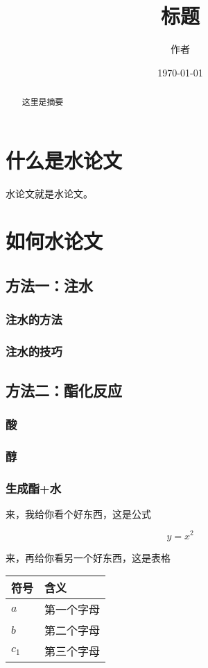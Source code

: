 \documentclass[UTF8]{ctexart}
\begin{document}
\title{标题}
\author{作者}
\date{\today}
\maketitle

\begin{abstract}
这里是摘要
\end{abstract}

\tableofcontents


\section{什么是水论文}

水论文就是水论文。

\section{如何水论文}

\subsection{方法一：注水}

\subsubsection{注水的方法}

\subsubsection{注水的技巧}

\subsection{方法二：酯化反应}

\subsubsection{酸}

\subsubsection{醇}

\subsubsection{生成酯+水}

来，我给你看个好东西，这是公式

\begin{equation}
y=x^2
\end{equation}

来，再给你看另一个好东西，这是表格


\begin{tabular}{ll}
\toprule
 符号 & 含义       \\
\midrule
 $a$    & 第一个字母 \\
 $b$    & 第二个字母 \\
 $c_1$    & 第三个字母 \\
\bottomrule
\end{tabular}
\end{document}
